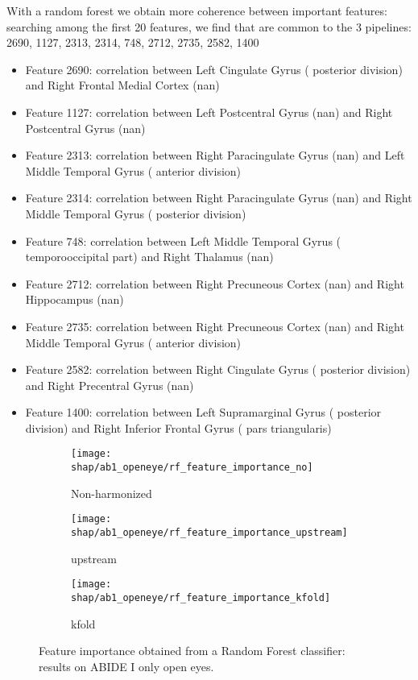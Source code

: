 \documentclass[11pt]{report}
\begin{document}
With a random forest we obtain more coherence between important features: searching among the first 20 features, we find that
are common to the 3 pipelines: 2690, 1127, 2313, 2314, 748, 2712, 2735, 2582, 1400



\begin{itemize}
\item Feature 2690: correlation between Left Cingulate Gyrus ( posterior division) and Right Frontal Medial Cortex (nan)
\item Feature 1127: correlation between Left Postcentral Gyrus (nan) and Right Postcentral Gyrus (nan)
\item Feature 2313: correlation between Right Paracingulate Gyrus (nan) and Left Middle Temporal Gyrus ( anterior division)
\item Feature 2314: correlation between Right Paracingulate Gyrus (nan) and Right Middle Temporal Gyrus ( posterior division)
\item Feature 748: correlation between Left Middle Temporal Gyrus ( temporooccipital part) and Right Thalamus (nan)
\item Feature 2712: correlation between Right Precuneous Cortex (nan) and Right Hippocampus (nan)
\item Feature 2735: correlation between Right Precuneous Cortex (nan) and Right Middle Temporal Gyrus ( anterior division)
\item Feature 2582: correlation between Right Cingulate Gyrus ( posterior division) and Right Precentral Gyrus (nan)
\item Feature 1400: correlation between Left Supramarginal Gyrus ( posterior division) and Right Inferior Frontal Gyrus ( pars triangularis)
\end{itemize}


\begin{figure}
\centering
\begin{subfigure}[b]{.45\textwidth}
   \texttt{[image: shap/ab1\_openeye/rf\_feature\_importance\_no]}
   \caption{Non-harmonized}
    
\end{subfigure}
\begin{subfigure}[b]{.45\textwidth}
   \texttt{[image: shap/ab1\_openeye/rf\_feature\_importance\_upstream]}
   \caption{upstream}
    
\end{subfigure}
\begin{subfigure}[b]{.45\textwidth}
   \texttt{[image: shap/ab1\_openeye/rf\_feature\_importance\_kfold]}
   \caption{kfold}
    
\end{subfigure}
\caption{Feature importance obtained from a Random Forest classifier: results on ABIDE I only open eyes.}
\label{fig:rf_feature_importance_ab1}
\end{figure}
\end{document}
